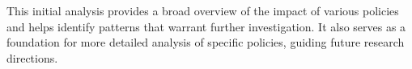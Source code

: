     This initial analysis provides a broad overview of the impact of various policies and
    helps identify patterns that warrant further investigation.
    It also serves as a foundation for more detailed analysis of specific policies, guiding future research directions.

    \begin{figure}[htbp]
        \centering
        \hfill
        \\
\end{figure}
